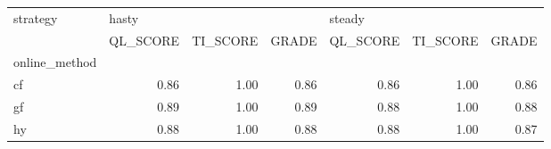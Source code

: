 \begin{tabular}{lrrrrrr}
\toprule
strategy & \multicolumn{3}{l}{hasty} & \multicolumn{3}{l}{steady} \\
{} & QL\_SCORE & TI\_SCORE & GRADE & QL\_SCORE & TI\_SCORE & GRADE \\
online\_method &          &          &       &          &          &       \\
\midrule
cf            &     0.86 &     1.00 &  0.86 &     0.86 &     1.00 &  0.86 \\
gf            &     0.89 &     1.00 &  0.89 &     0.88 &     1.00 &  0.88 \\
hy            &     0.88 &     1.00 &  0.88 &     0.88 &     1.00 &  0.87 \\
\bottomrule
\end{tabular}
